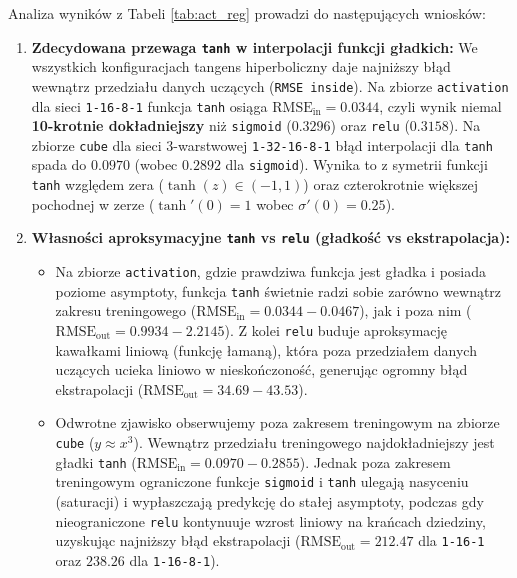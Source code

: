 \documentclass{article}
\begin{document}
Analiza wyników z Tabeli \ref{tab:act_reg} prowadzi do następujących wniosków:
\begin{enumerate}
    \item \textbf{Zdecydowana przewaga \texttt{tanh} w interpolacji funkcji gładkich:} We wszystkich konfiguracjach tangens hiperboliczny daje najniższy błąd wewnątrz przedziału danych uczących (\texttt{RMSE inside}). Na zbiorze \texttt{activation} dla sieci \texttt{1-16-8-1} funkcja \texttt{tanh} osiąga $\text{RMSE}_{\text{in}} = \mathbf{0.0344}$, czyli wynik niemal \textbf{10-krotnie dokładniejszy} niż \texttt{sigmoid} ($0.3296$) oraz \texttt{relu} ($0.3158$). Na zbiorze \texttt{cube} dla sieci 3-warstwowej \texttt{1-32-16-8-1} błąd interpolacji dla \texttt{tanh} spada do $\mathbf{0.0970}$ (wobec $0.2892$ dla \texttt{sigmoid}). Wynika to z symetrii funkcji \texttt{tanh} względem zera ($\tanh(z) \in (-1, 1)$) oraz czterokrotnie większej pochodnej w zerze ($\tanh'(0)=1$ wobec $\sigma'(0)=0.25$).
    \item \textbf{Własności aproksymacyjne \texttt{tanh} vs \texttt{relu} (gładkość vs ekstrapolacja):}
    \begin{itemize}
        \item Na zbiorze \texttt{activation}, gdzie prawdziwa funkcja jest gładka i posiada poziome asymptoty, funkcja \texttt{tanh} świetnie radzi sobie zarówno wewnątrz zakresu treningowego ($\text{RMSE}_{\text{in}} = 0.0344 - 0.0467$), jak i poza nim ($\text{RMSE}_{\text{out}} = 0.9934 - 2.2145$). Z kolei \texttt{relu} buduje aproksymację kawałkami liniową (funkcję łamaną), która poza przedziałem danych uczących ucieka liniowo w nieskończoność, generując ogromny błąd ekstrapolacji ($\text{RMSE}_{\text{out}} = 34.69 - 43.53$).
        \item Odwrotne zjawisko obserwujemy poza zakresem treningowym na zbiorze \texttt{cube} ($y \approx x^3$). Wewnątrz przedziału treningowego najdokładniejszy jest gładki \texttt{tanh} ($\text{RMSE}_{\text{in}} = 0.0970 - 0.2855$). Jednak poza zakresem treningowym ograniczone funkcje \texttt{sigmoid} i \texttt{tanh} ulegają nasyceniu (saturacji) i wypłaszczają predykcję do stałej asymptoty, podczas gdy nieograniczone \texttt{relu} kontynuuje wzrost liniowy na krańcach dziedziny, uzyskując najniższy błąd ekstrapolacji ($\text{RMSE}_{\text{out}} = 212.47$ dla \texttt{1-16-1} oraz $238.26$ dla \texttt{1-16-8-1}).
    \end{itemize}

\end{enumerate}
\end{document}
